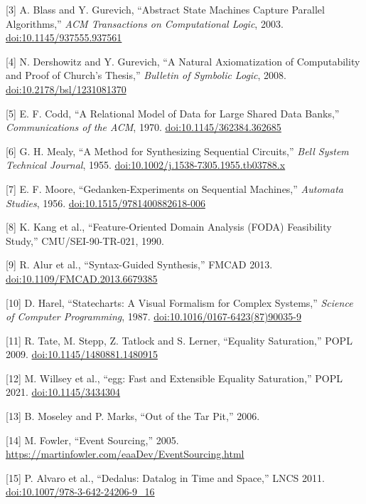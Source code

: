 \documentclass[10pt,letterpaper]{article}
\begin{document}
{[}3{]} A. Blass and Y. Gurevich, ``Abstract State Machines Capture
Parallel Algorithms,'' \emph{ACM Transactions on Computational Logic},
2003.
\href{https://doi.org/10.1145/937555.937561}{doi:10.1145/937555.937561}

{[}4{]} N. Dershowitz and Y. Gurevich, ``A Natural Axiomatization of
Computability and Proof of Church's Thesis,'' \emph{Bulletin of Symbolic
Logic}, 2008.
\href{https://doi.org/10.2178/bsl/1231081370}{doi:10.2178/bsl/1231081370}

{[}5{]} E. F. Codd, ``A Relational Model of Data for Large Shared Data
Banks,'' \emph{Communications of the ACM}, 1970.
\href{https://doi.org/10.1145/362384.362685}{doi:10.1145/362384.362685}

{[}6{]} G. H. Mealy, ``A Method for Synthesizing Sequential Circuits,''
\emph{Bell System Technical Journal}, 1955.
\href{https://doi.org/10.1002/j.1538-7305.1955.tb03788.x}{doi:10.1002/j.1538-7305.1955.tb03788.x}

{[}7{]} E. F. Moore, ``Gedanken-Experiments on Sequential Machines,''
\emph{Automata Studies}, 1956.
\href{https://doi.org/10.1515/9781400882618-006}{doi:10.1515/9781400882618-006}

{[}8{]} K. Kang et al., ``Feature-Oriented Domain Analysis (FODA)
Feasibility Study,'' CMU/SEI-90-TR-021, 1990.

{[}9{]} R. Alur et al., ``Syntax-Guided Synthesis,'' FMCAD 2013.
\href{https://doi.org/10.1109/FMCAD.2013.6679385}{doi:10.1109/FMCAD.2013.6679385}

{[}10{]} D. Harel, ``Statecharts: A Visual Formalism for Complex
Systems,'' \emph{Science of Computer Programming}, 1987.
\href{https://doi.org/10.1016/0167-6423(87)90035-9}{doi:10.1016/0167-6423(87)90035-9}

{[}11{]} R. Tate, M. Stepp, Z. Tatlock and S. Lerner, ``Equality
Saturation,'' POPL 2009.
\href{https://doi.org/10.1145/1480881.1480915}{doi:10.1145/1480881.1480915}

{[}12{]} M. Willsey et al., ``egg: Fast and Extensible Equality
Saturation,'' POPL 2021.
\href{https://doi.org/10.1145/3434304}{doi:10.1145/3434304}

{[}13{]} B. Moseley and P. Marks, ``Out of the Tar Pit,'' 2006.

{[}14{]} M. Fowler, ``Event Sourcing,'' 2005.
\url{https://martinfowler.com/eaaDev/EventSourcing.html}

{[}15{]} P. Alvaro et al., ``Dedalus: Datalog in Time and Space,'' LNCS
2011.
\href{https://doi.org/10.1007/978-3-642-24206-9_16}{doi:10.1007/978-3-642-24206-9\_16}
\end{document}
